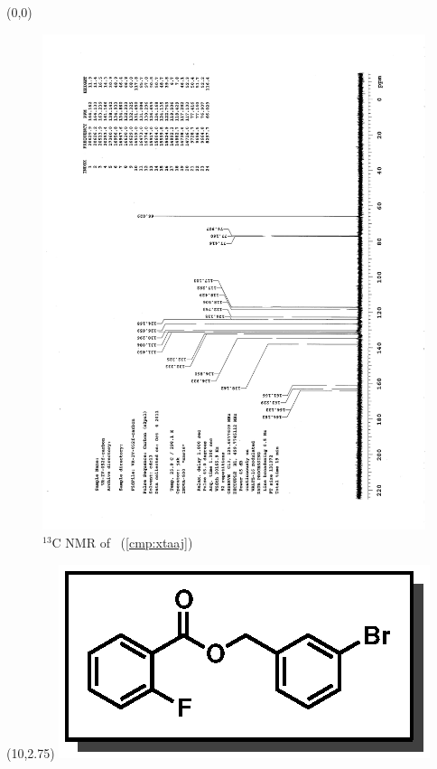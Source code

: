 \clearpage
\begin{textblock}{20}(0,0)
\begin{figure}[htb]
\caption{$^{13}$C NMR of  \CMPxtaaj\ (\ref{cmp:xtaaj})}
\includegraphics[scale=0.75, trim = 0mm 0mm 0mm 5mm,
clip]{chp_asymmetric/images/nmr/xtaajC}
\vspace{-100pt}
\end{figure}
\end{textblock}
\begin{textblock}{1}(10,2.75)
\includegraphics[scale=0.8, angle=90]{chp_asymmetric/images/xtaaj}
\end{textblock}
